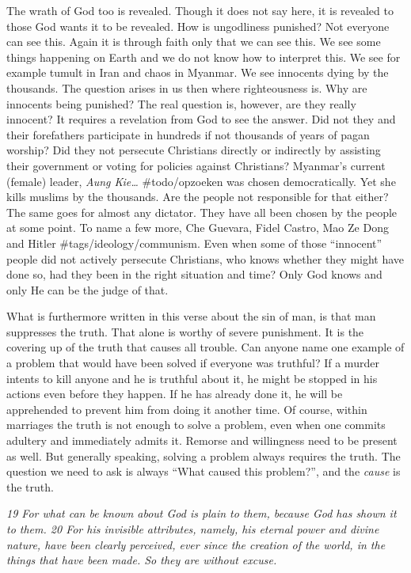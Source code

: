 The wrath of God too is revealed. Though it does not say here, it is
revealed to those God wants it to be revealed. How is ungodliness
punished? Not everyone can see this. Again it is through faith only that
we can see this. We see some things happening on Earth and we do not
know how to interpret this. We see for example tumult in Iran and chaos
in Myanmar. We see innocents dying by the thousands. The question arises
in us then where righteousness is. Why are innocents being punished? The
real question is, however, are they really innocent? It requires a
revelation from God to see the answer. Did not they and their
forefathers participate in hundreds if not thousands of years of pagan
worship? Did they not persecute Christians directly or indirectly by
assisting their government or voting for policies against Christians?
Myanmar's current (female) leader, \emph{Aung Kie\ldots{}}
\#todo/opzoeken was chosen democratically. Yet she kills muslims by the
thousands. Are the people not responsible for that either? The same goes
for almost any dictator. They have all been chosen by the people at some
point. To name a few more, Che Guevara, Fidel Castro, Mao Ze Dong and
Hitler \#tags/ideology/communism. Even when some of those ``innocent''
people did not actively persecute Christians, who knows whether they
might have done so, had they been in the right situation and time? Only
God knows and only He can be the judge of that.

What is furthermore written in this verse about the sin of man, is that
man suppresses the truth. That alone is worthy of severe punishment. It
is the covering up of the truth that causes all trouble. Can anyone name
one example of a problem that would have been solved if everyone was
truthful? If a murder intents to kill anyone and he is truthful about
it, he might be stopped in his actions even before they happen. If he
has already done it, he will be apprehended to prevent him from doing it
another time. Of course, within marriages the truth is not enough to
solve a problem, even when one commits adultery and immediately admits
it. Remorse and willingness need to be present as well. But generally
speaking, solving a problem always requires the truth. The question we
need to ask is always ``What caused this problem?'', and the
\emph{cause} is the truth.

\emph{19 For what can be known about God is plain to them, because God
has shown it to them. 20 For his invisible attributes, namely, his
eternal power and divine nature, have been clearly perceived, ever since
the creation of the world, in the things that have been made. So they
are without excuse.}

